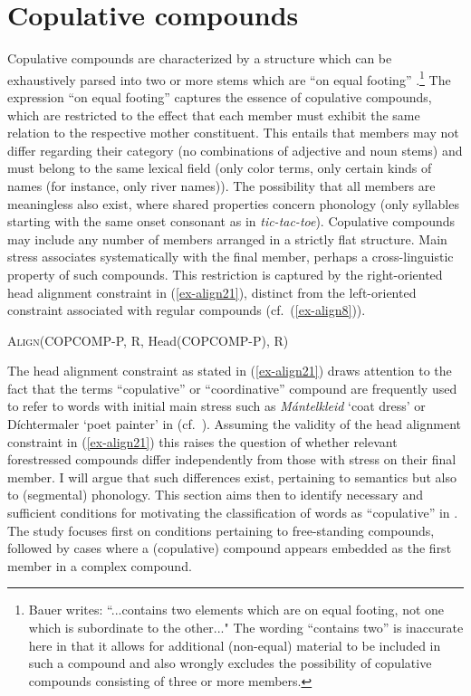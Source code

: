 \documentclass[output=paper
 ,nobabel
 ,draftmode
 ,colorlinks, citecolor=brown
]{langscibook}
\begin{document}
\section{Copulative compounds}
\label{sec-copcom}

Copulative compounds are characterized by a structure which can be exhaustively parsed into two or more stems which are “on equal footing” \citep[83]{Bauer2017}.\footnote{Bauer writes: “...contains two elements which are on equal footing, not one which is subordinate to the other..." The wording “contains two” is inaccurate here in that it allows for additional (non-equal) material to be included in such a compound and also wrongly excludes the possibility of copulative compounds consisting of three or more members.}
The expression “on equal footing” captures the essence of copulative compounds, which are restricted to the effect that each member must exhibit the same relation to the respective mother constituent. This entails that members may not differ regarding their category (\eg no combinations of adjective and noun stems) and must belong to the same lexical field (\eg only color terms, only certain kinds of names (for instance, only river names)). The possibility that all members are meaningless also exist, where shared properties concern phonology (\eg only syllables starting with the same onset consonant as in  \emph{tic-tac-toe}). Copulative compounds may include any number of members arranged in a strictly flat structure. Main stress associates systematically with the final member, perhaps a cross-linguistic property of such compounds. This restriction is captured by the right-oriented head alignment constraint in (\ref{ex-align21}), distinct from the left-oriented constraint associated with regular compounds (cf.\ (\ref{ex-align8})). 

\ea\label{ex-align21}
\textsc{Align}(COPCOMP-P, R, Head(COPCOMP-P), R)
\z

\noindent
The head alignment constraint as stated in (\ref{ex-align21}) draws attention to the fact that the terms “copulative” or “coordinative” compound are frequently used to refer to words with initial main stress such as \emph{Mántelkleid} `coat dress' or {Díchtermaler} `poet painter' in  (cf.\ \citealp{OrtnerOrtner1984}). Assuming the validity of the head alignment constraint in (\ref{ex-align21}) this raises the question of whether relevant forestressed compounds differ independently  from those with stress on their final member. I will argue that such differences exist, pertaining to semantics but also to (segmental) phonology. This section aims then to identify necessary and sufficient conditions for motivating the classification of words as “copulative” in . The study focuses first on conditions pertaining to free-standing compounds, followed by cases where a (copulative) compound appears embedded as the first member in a complex compound.  
\end{document}
